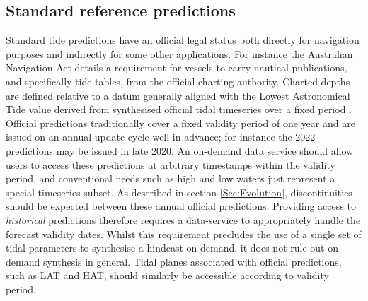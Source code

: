 \subsection{Standard reference predictions}
\label{Sec:flavour1}
Standard tide predictions have an official legal status both directly for navigation purposes and indirectly for some other applications.   
For instance the Australian Navigation Act \citep{AusNavAct2012} details a requirement for vessels to carry nautical publications, and specifically tide tables, from the official charting authority.  Charted depths are defined relative to a datum generally aligned with the Lowest Astronomical Tide value derived from synthesised official tidal timeseries over a fixed period \citep{PCTMSL-sp9}.
Official predictions traditionally cover a fixed validity period of one year and are issued on an annual update cycle well in advance; for instance the 2022 predictions may be issued in late 2020.  An on-demand data service should allow users to access these predictions at arbitrary timestamps within the validity period, and conventional needs such as high and low waters just represent a special timeseries subset.
As described in section \ref{Sec:Evolution}, discontinuities should be expected between these annual official predictions. 
Providing access to \textit{historical} predictions therefore requires a data-service to appropriately handle the forecast validity dates.  Whilst this requirement precludes the use of a single set of tidal parameters to synthesise a hindcast on-demand, it does not rule out on-demand synthesis in general.
Tidal planes associated with official predictions, such as LAT and HAT, should similarly be accessible according to validity period.


